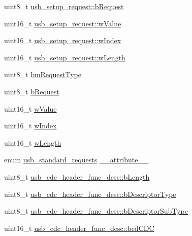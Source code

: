 \begin{DoxyCompactItemize}
\item 
uint8\-\_\-t \hyperlink{group___p_i_o_s___u_s_b___d_e_f_s_ga55cbbe5ea2f7842c4df02bda43532cb5}{usb\-\_\-setup\-\_\-request\-::b\-Request}
\item 
uint16\-\_\-t \hyperlink{group___p_i_o_s___u_s_b___d_e_f_s_ga1f14de3d7b02c5e6ba04cf9334e0d259}{usb\-\_\-setup\-\_\-request\-::w\-Value}
\item 
uint16\-\_\-t \hyperlink{group___p_i_o_s___u_s_b___d_e_f_s_ga1469080fa91077cdc69a2f4dd5509974}{usb\-\_\-setup\-\_\-request\-::w\-Index}
\item 
uint16\-\_\-t \hyperlink{group___p_i_o_s___u_s_b___d_e_f_s_gae0ab089c03a957e9e3a61874d5565d44}{usb\-\_\-setup\-\_\-request\-::w\-Length}
\item 
uint8\-\_\-t \hyperlink{group___p_i_o_s___u_s_b___d_e_f_s_gabea120ea756eb0abdb8aafb8713f61f4}{bm\-Request\-Type}
\item 
uint8\-\_\-t \hyperlink{group___p_i_o_s___u_s_b___d_e_f_s_ga1e7be110861bd4ff75c86d5214f31543}{b\-Request}
\item 
uint16\-\_\-t \hyperlink{group___p_i_o_s___u_s_b___d_e_f_s_ga7383d0165ad8eab48aa239c005199121}{w\-Value}
\item 
uint16\-\_\-t \hyperlink{group___p_i_o_s___u_s_b___d_e_f_s_gadc578ce35d89d52deba61ee6f312f177}{w\-Index}
\item 
uint16\-\_\-t \hyperlink{group___p_i_o_s___u_s_b___d_e_f_s_ga496c03443b177fd2e6c93616064d2934}{w\-Length}
\item 
enum \hyperlink{group___p_i_o_s___u_s_b___d_e_f_s_ga656cd9a1af7abe6ec812f6ee50b223f9}{usb\-\_\-standard\-\_\-requests} \hyperlink{group___p_i_o_s___u_s_b___d_e_f_s_ga09790ada76856d0562b9eef5d9637f6c}{\-\_\-\-\_\-attribute\-\_\-\-\_\-}
\item 
uint8\-\_\-t \hyperlink{group___p_i_o_s___u_s_b___d_e_f_s_ga15e505dd53db0e081c58b58f3fcd1ae0}{usb\-\_\-cdc\-\_\-header\-\_\-func\-\_\-desc\-::b\-Length}
\item 
uint8\-\_\-t \hyperlink{group___p_i_o_s___u_s_b___d_e_f_s_ga09d781c982c0be7203ec0922f818350d}{usb\-\_\-cdc\-\_\-header\-\_\-func\-\_\-desc\-::b\-Descriptor\-Type}
\item 
uint8\-\_\-t \hyperlink{group___p_i_o_s___u_s_b___d_e_f_s_ga9bdb88cd9eb6973d4b508010df9d45ff}{usb\-\_\-cdc\-\_\-header\-\_\-func\-\_\-desc\-::b\-Descriptor\-Sub\-Type}
\item 
uint16\-\_\-t \hyperlink{group___p_i_o_s___u_s_b___d_e_f_s_gaedee5ac39032e71dd0837e37f480a398}{usb\-\_\-cdc\-\_\-header\-\_\-func\-\_\-desc\-::bcd\-C\-D\-C}

\end{DoxyCompactItemize}
